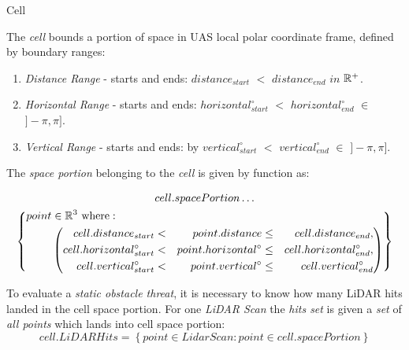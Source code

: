\begin{definition}{Cell}\label{def:cell}
	
    \noindent The \emph{cell} bounds a portion of space in UAS local polar coordinate frame, defined by boundary ranges:
    \begin{enumerate}
        
        \item \emph{Distance Range} -  starts and ends: $distance_{start}$ $<$ $distance_{end}$ $in$ $\mathbb{R}^+$.
        
        \item \emph{Horizontal Range} - starts and ends: $horizontal^\circ_{start}$ $<$ $horizontal^\circ_{end}$ $\in$ $]-\pi,\pi]$.
        
        \item \emph{Vertical Range} - starts and ends: by $vertical^\circ_{start}$ $<$ $vertical^\circ_{end}$ $\in$ $]-\pi,\pi]$.
    \end{enumerate}
    
    \noindent The \emph{space portion} belonging to the \emph{cell} is given by function as:
    
    \begin{multline}\label{eq:boundedSpaceCell}
        cell.space Portion\dots\\
            \left \{
                \begin{aligned}
                point& \in \mathbb{R}^3 \text{ where}:\\
                    &\left(\begin{aligned}
                        cell.distance_{start} &<& point.distance &\le& cell.distance_{end},\\
                        cell.horizontal^\circ_{start} &<& point.horizontal^\circ &\le&  cell.horizontal^\circ_{end},\\
                        cell.vertical^\circ_{start} &<& point.vertical^\circ &\le& cell.vertical^\circ_{end}\\
                    \end{aligned}\right)
                \end{aligned}
            \right\}
    \end{multline}
    
    \noindent To evaluate a \emph{static obstacle threat}, it is necessary to know how many LiDAR hits landed in the cell space portion. For one \emph{LiDAR Scan} the \emph{hits set} is given a \emph{set} of \emph{all points} which lands into cell space portion:
    \begin{equation}\label{eq:LidarHitsCell}
        cell. LiDAR Hits = \left\{point \in Lidar Scan:  point \in cell. space Portion\right\}    
    \end{equation}
    

\end{definition}
